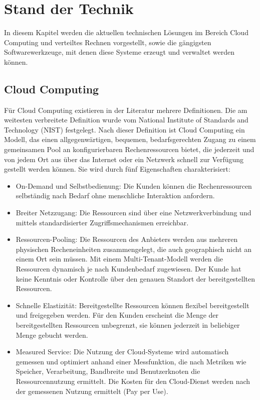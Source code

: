 \chapter{Stand der Technik}
\label{ch:StandDerTechnik}
In diesem Kapitel werden die aktuellen technischen Lösungen im Bereich Cloud Computing und verteiltes Rechnen vorgestellt, sowie die gängigsten Softwarewerkzeuge, mit denen diese Systeme erzeugt und verwaltet werden können.

\section{Cloud Computing}
Für Cloud Computing existieren in der Literatur mehrere Definitionen. \cite{Marston2011} Die am weitesten verbreitete Definition wurde vom National Institute of Standards and Technology (NIST) festgelegt. Nach dieser Definition ist Cloud Computing ein Modell, das einen allgegenwärtigen, bequemen, bedarfsgerechten Zugang zu einem gemeinsamen Pool an konfigurierbaren Rechenressourcen bietet, die jederzeit und von jedem Ort aus über das Internet oder ein Netzwerk schnell zur Verfügung gestellt werden können. Sie wird durch fünf Eigenschaften charakterisiert:   \\
\begin{itemize}
	\item On-Demand und Selbstbedienung: Die Kunden können die Rechenressourcen selbständig nach Bedarf ohne menschliche Interaktion anfordern.
	\item Breiter Netzzugang: Die Ressourcen sind über eine Netzwerkverbindung und mittels standardisierter Zugriffsmechanismen erreichbar.
	\item Ressourcen-Pooling: Die Ressourcen des Anbieters werden aus mehreren physischen Recheneinheiten zusammengelegt, die auch geographisch nicht an einem Ort sein müssen. Mit einem Multi-Tenant-Modell werden die Ressourcen dynamisch je nach Kundenbedarf zugewiesen. Der Kunde hat keine Kenntnis oder Kontrolle über den genauen Standort der bereitgestellten Ressourcen.
	\item Schnelle Elastizität: Bereitgestellte Ressourcen können flexibel bereitgestellt und freigegeben werden. Für den Kunden erscheint die Menge der bereitgestellten Ressourcen unbegrenzt, sie können jederzeit in beliebiger Menge gebucht werden.
	\item Measured Service: Die Nutzung der Cloud-Systeme wird automatisch gemessen und optimiert anhand einer Messfunktion, die nach Metriken wie Speicher, Verarbeitung, Bandbreite und Benutzerknoten die Ressourcennutzung ermittelt. Die Kosten für den Cloud-Dienst werden nach der gemessenen Nutzung ermittelt (Pay per Use). \cite{Mell2011}
\end{itemize}

